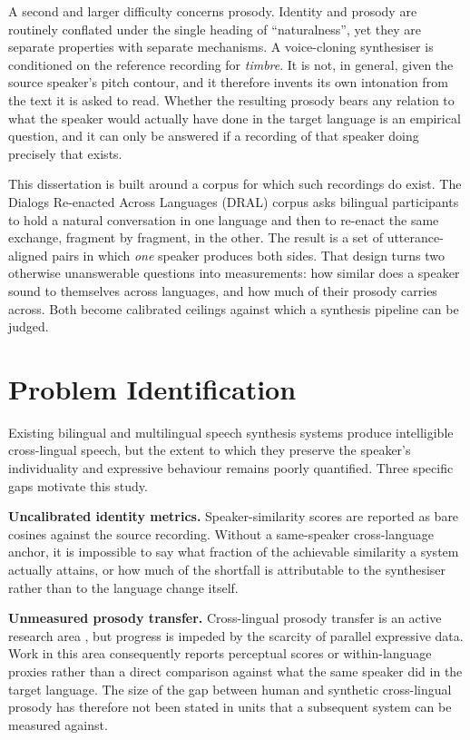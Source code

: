 A second and larger difficulty concerns prosody. Identity and prosody are routinely conflated
under the single heading of ``naturalness'', yet they are separate properties with separate
mechanisms. A voice-cloning synthesiser is conditioned on the reference recording for
\emph{timbre}. It is not, in general, given the source speaker's pitch contour, and it therefore
invents its own intonation from the text it is asked to read. Whether the resulting prosody bears
any relation to what the speaker would actually have done in the target language is an empirical
question, and it can only be answered if a recording of that speaker doing precisely that exists.

This dissertation is built around a corpus for which such recordings do exist. The Dialogs
Re-enacted Across Languages (DRAL) corpus \cite{ward2023dral} asks bilingual participants to hold a
natural conversation in one language and then to re-enact the same exchange, fragment by fragment,
in the other. The result is a set of utterance-aligned pairs in which \emph{one} speaker produces
both sides. That design turns two otherwise unanswerable questions into measurements: how similar
does a speaker sound to themselves across languages, and how much of their prosody carries across.
Both become calibrated ceilings against which a synthesis pipeline can be judged.

\section{Problem Identification}
\label{sec:problem}

Existing bilingual and multilingual speech synthesis systems produce intelligible cross-lingual
speech, but the extent to which they preserve the speaker's individuality and expressive behaviour
remains poorly quantified. Three specific gaps motivate this study.

\textbf{Uncalibrated identity metrics.} Speaker-similarity scores are reported as bare cosines
against the source recording. Without a same-speaker cross-language anchor, it is impossible to say
what fraction of the achievable similarity a system actually attains, or how much of the shortfall
is attributable to the synthesiser rather than to the language change itself.

\textbf{Unmeasured prosody transfer.} Cross-lingual prosody transfer is an active research area
\cite{swiatkowski2023dubbing,song2023styles2st}, but progress is impeded by the scarcity of parallel
expressive data. Work in this area consequently reports perceptual scores or within-language
proxies rather than a direct comparison against what the same speaker did in the target language.
The size of the gap between human and synthetic cross-lingual prosody has therefore not been stated
in units that a subsequent system can be measured against.

